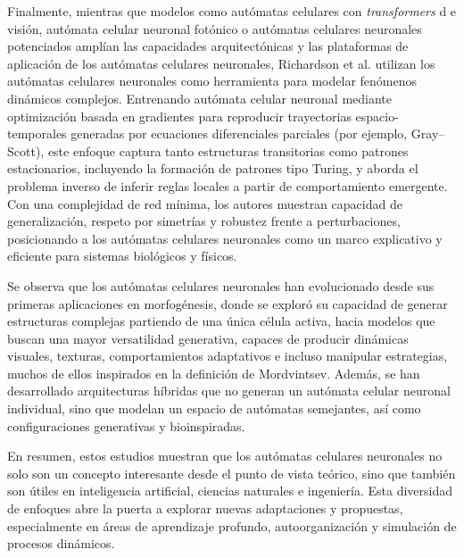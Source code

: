 Finalmente, mientras que modelos como autómatas celulares con \textit{transformers} d e visión, autómata celular neuronal fotónico o autómatas celulares neuronales potenciados amplían las capacidades arquitectónicas y las plataformas de aplicación de los autómatas celulares neuronales, Richardson et al. \cite{richardsonNCA} utilizan los autómatas celulares neuronales como herramienta para modelar fenómenos dinámicos complejos. Entrenando autómata celular neuronal mediante optimización basada en gradientes para reproducir trayectorias espacio-temporales generadas por ecuaciones diferenciales parciales (por ejemplo, Gray–Scott), este enfoque captura tanto estructuras transitorias como patrones estacionarios, incluyendo la formación de patrones tipo Turing, y aborda el problema inverso de inferir reglas locales a partir de comportamiento emergente. Con una complejidad de red mínima, los autores muestran capacidad de generalización, respeto por simetrías y robustez frente a perturbaciones, posicionando a los autómatas celulares neuronales como un marco explicativo y eficiente para sistemas biológicos y físicos.

Se observa que los autómatas celulares neuronales han evolucionado desde sus primeras aplicaciones en morfogénesis, donde se exploró su capacidad de generar estructuras complejas partiendo de una única célula activa, hacia modelos que buscan una mayor versatilidad generativa, capaces de producir dinámicas visuales, texturas, comportamientos adaptativos e incluso manipular estrategias, muchos de ellos inspirados en la definición de Mordvintsev. Además, se han desarrollado arquitecturas híbridas que no generan un autómata celular neuronal individual, sino que modelan un espacio de autómatas semejantes, así como configuraciones generativas y bioinspiradas.

En resumen, estos estudios muestran que los autómatas celulares neuronales no solo son un concepto interesante desde el punto de vista teórico, sino que también son útiles en inteligencia artificial, ciencias naturales e ingeniería. Esta diversidad de enfoques abre la puerta a explorar nuevas adaptaciones y propuestas, especialmente en áreas de aprendizaje profundo, autoorganización y simulación de procesos dinámicos.